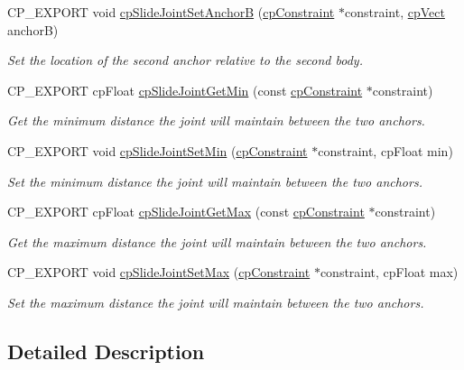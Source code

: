 \begin{DoxyCompactItemize}
\mbox{\label{group__cpSlideJoint_ga511145fb4b1913aa85f7fe502e4407d1}} 
C\+P\+\_\+\+E\+X\+P\+O\+RT void \hyperlink{group__cpSlideJoint_ga511145fb4b1913aa85f7fe502e4407d1}{cp\+Slide\+Joint\+Set\+AnchorB} (\hyperlink{structcpConstraint}{cp\+Constraint} $\ast$constraint, \hyperlink{structcpVect}{cp\+Vect} anchorB)
\begin{DoxyCompactList}\small\item\em Set the location of the second anchor relative to the second body. \end{DoxyCompactList}\item 
\mbox{\label{group__cpSlideJoint_gaa3e2239ae46655548ecd29d9fe6b23f9}} 
C\+P\+\_\+\+E\+X\+P\+O\+RT cp\+Float \hyperlink{group__cpSlideJoint_gaa3e2239ae46655548ecd29d9fe6b23f9}{cp\+Slide\+Joint\+Get\+Min} (const \hyperlink{structcpConstraint}{cp\+Constraint} $\ast$constraint)
\begin{DoxyCompactList}\small\item\em Get the minimum distance the joint will maintain between the two anchors. \end{DoxyCompactList}\item 
\mbox{\label{group__cpSlideJoint_ga67df01ba84cfc0897884e241c8337110}} 
C\+P\+\_\+\+E\+X\+P\+O\+RT void \hyperlink{group__cpSlideJoint_ga67df01ba84cfc0897884e241c8337110}{cp\+Slide\+Joint\+Set\+Min} (\hyperlink{structcpConstraint}{cp\+Constraint} $\ast$constraint, cp\+Float min)
\begin{DoxyCompactList}\small\item\em Set the minimum distance the joint will maintain between the two anchors. \end{DoxyCompactList}\item 
\mbox{\label{group__cpSlideJoint_ga6c6b89b775f61ac58aa37608869a35c7}} 
C\+P\+\_\+\+E\+X\+P\+O\+RT cp\+Float \hyperlink{group__cpSlideJoint_ga6c6b89b775f61ac58aa37608869a35c7}{cp\+Slide\+Joint\+Get\+Max} (const \hyperlink{structcpConstraint}{cp\+Constraint} $\ast$constraint)
\begin{DoxyCompactList}\small\item\em Get the maximum distance the joint will maintain between the two anchors. \end{DoxyCompactList}\item 
\mbox{\label{group__cpSlideJoint_ga115742df8d21e9fd150cd54ab0814daf}} 
C\+P\+\_\+\+E\+X\+P\+O\+RT void \hyperlink{group__cpSlideJoint_ga115742df8d21e9fd150cd54ab0814daf}{cp\+Slide\+Joint\+Set\+Max} (\hyperlink{structcpConstraint}{cp\+Constraint} $\ast$constraint, cp\+Float max)
\begin{DoxyCompactList}\small\item\em Set the maximum distance the joint will maintain between the two anchors. \end{DoxyCompactList}\end{DoxyCompactItemize}


\subsection{Detailed Description}
